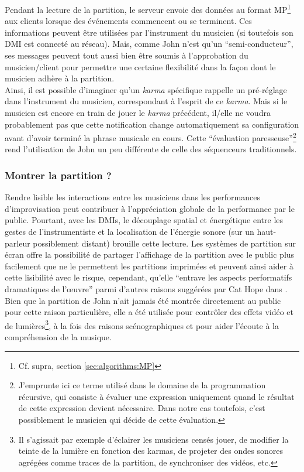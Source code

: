 \noindent Pendant la lecture de la partition, le serveur envoie des données au format MP\footnote{Cf. supra, section \ref{sec:algorithms:MP}} aux clients lorsque des événements commencent ou se terminent. Ces informations peuvent être utilisées par l'instrument du musicien (si toutefois son \gls{DMI} est connecté au réseau). Mais, comme John n'est qu'un ``semi-conducteur'', ses messages peuvent tout aussi bien être soumis à l'approbation du musicien/client pour permettre une certaine flexibilité dans la façon dont le musicien adhère à la partition.\\
\indent Ainsi, il est possible d'imaginer qu'un \textit{karma} spécifique rappelle un pré-réglage dans l'instrument du musicien, correspondant à l'esprit de ce \textit{karma}. Mais si le musicien est encore en train de jouer le \textit{karma} précédent, il/elle ne voudra probablement pas que cette notification change automatiquement sa configuration avant d'avoir terminé la phrase musicale en cours. Cette ``évaluation paresseuse''\footnote{J'emprunte ici ce terme utilisé dans le domaine de la programmation récursive, qui consiste à évaluer une expression uniquement quand le résultat de cette expression devient nécessaire. Dans notre cas toutefois, c'est possiblement le musicien qui décide de cette évaluation.} rend l'utilisation de John un peu différente de celle des séquenceurs traditionnels.
\subsubsection{Montrer la partition ?}

\noindent Rendre lisible les interactions entre les musiciens dans les performances d'improvisation peut contribuer à l'appréciation globale de la performance par le public. Pourtant, avec les \glspl{DMI}, le découplage spatial et énergétique entre les gestes de l'instrumentiste et la localisation de l'énergie sonore (sur un haut-parleur possiblement distant) brouille cette lecture. Les systèmes de partition sur écran offre la possibilité de partager l'affichage de la partition avec le public plus facilement que ne le permettent les partitions imprimées et peuvent ainsi aider à cette lisibilité avec le risque, cependant, qu'elle ``entrave les aspects performatifs dramatiques de l'œuvre'' parmi d'autres raisons suggérées par Cat Hope dans \cite{hope_screen_2011}.\\
\indent Bien que la partition de John n'ait jamais été montrée directement au public pour cette raison particulière, elle a été utilisée pour contrôler des effets vidéo et de lumières\footnote{Il s'agissait par exemple d'éclairer les musiciens censés jouer, de modifier la teinte de la lumière en fonction des karmas, de projeter des ondes sonores agrégées comme traces de la partition, de synchroniser des vidéos, etc.}, à la fois des raisons scénographiques et pour aider l'écoute à la compréhension de la musique.

